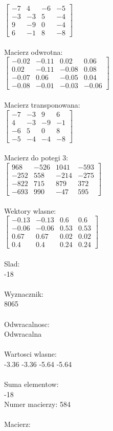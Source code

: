 \documentclass[a4paper,12pt]{article}
\begin{document}
$\begin{bmatrix} -7&4&-6&-5\\-3&-3&5&-4\\9&-9&0&-4\\6&-1&8&-8 \end{bmatrix}$
\\
\\
Macierz odwrotna:\\

$\begin{bmatrix} -0.02&-0.11&0.02&0.06\\0.02&-0.11&-0.08&0.08\\-0.07&0.06&-0.05&0.04\\-0.08&-0.01&-0.03&-0.06 \end{bmatrix}$
\\
\\
Macierz transponowana:\\

$\begin{bmatrix} -7&-3&9&6\\4&-3&-9&-1\\-6&5&0&8\\-5&-4&-4&-8 \end{bmatrix}$
\\
\\
Macierz do potegi 3:\\

$\begin{bmatrix} 968&-526&1041&-593\\-252&558&-214&-275\\-822&715&879&372\\-693&990&-47&595 \end{bmatrix}$
\\
\\
Wektory wlasne:\\

$\begin{bmatrix} -0.13&-0.13&0.6&0.6\\-0.06&-0.06&0.53&0.53\\0.67&0.67&0.02&0.02\\0.4&0.4&0.24&0.24 \end{bmatrix}$
\\
\\
Slad:\\
-18
\\
\\
Wyznacznik:\\
8065
\\
\\
Odwracalnosc:\\
Odwracalna
\\
\\
Wartosci wlasne:\\
-3.36 -3.36 -5.64 -5.64
\\
\\
Suma elementow:\\
-18
\\
\newpage
Numer macierzy:
584
\\
\\
Macierz:\\
\end{document}

